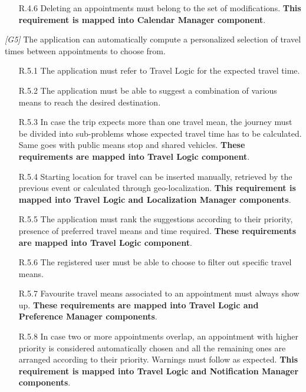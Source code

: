 \begin{description}
\begin{itemize}
		 	\item [R.4.6] Deleting an appointments must belong to the set of modifications.
		 	\textbf{This requirement is mapped into Calendar Manager component}.
		 \end{itemize}


	\vskip0.75cm
	\item \textit{[G5]} The application can automatically compute a personalized selection of travel times between appointments to choose from.
		\begin{itemize}
			\item [R.5.1] The application must refer to Travel Logic for the expected travel time.

			\item [R.5.2] The application must be able to suggest a combination of various means to reach the desired destination.

			\item [R.5.3] In case the trip expects more than one travel mean, the journey must be divided into sub-problems whose expected travel time has to be calculated. Same goes with public means stop and shared vehicles.
			\textbf{These requirements are mapped into Travel Logic component}.

			\item [R.5.4] Starting location for travel can be inserted manually, retrieved by the previous event or calculated through geo-localization.
			\textbf{This requirement is mapped into Travel Logic and Localization Manager components}.

			\item [R.5.5] The application must rank the suggestions according to their priority, presence of preferred travel means and time required.
			\textbf{These requirements are mapped into Travel Logic component}.

			\item [R.5.6] The registered user must be able to choose to filter out specific travel means.			

			\item [R.5.7] Favourite travel means associated to an appointment must always show up.
			\textbf{These requirements are mapped into Travel Logic and Preference Manager components}.

			\item [R.5.8] In case two or more appointments overlap, an appointment with higher priority is considered automatically chosen and all the remaining ones are arranged according to their priority. Warnings must follow as expected.
			\textbf{This requirement is mapped into Travel Logic and Notification Manager components}.


\end{itemize}
\end{description}
